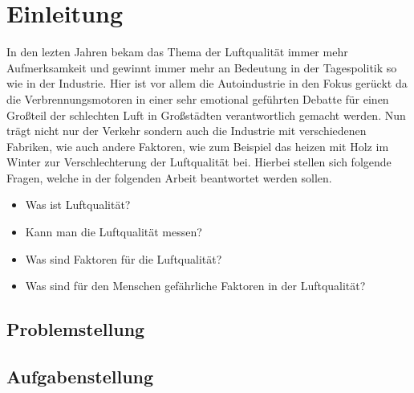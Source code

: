 
\chapter{Einleitung}\label{cha:Einleitung}
In den lezten Jahren bekam das Thema der Luftqualität immer mehr Aufmerksamkeit und gewinnt immer mehr an Bedeutung in der Tagespolitik so wie in der Industrie. Hier ist vor allem die Autoindustrie in den Fokus gerückt da die Verbrennungsmotoren in einer sehr emotional geführten Debatte für einen Großteil der schlechten Luft in Großstädten verantwortlich gemacht werden. Nun trägt nicht nur der Verkehr sondern auch die Industrie mit verschiedenen Fabriken, wie auch andere Faktoren, wie zum Beispiel das heizen mit Holz im Winter zur Verschlechterung der Luftqualität bei.  
\newline
Hierbei stellen sich folgende Fragen, welche in der folgenden Arbeit beantwortet werden sollen.
\begin{itemize}
	\item Was ist Luftqualität?
	\item Kann man die Luftqualität messen?
	\item Was sind Faktoren für die Luftqualität?
	\item Was sind für den Menschen gefährliche Faktoren in der Luftqualität?
\end{itemize}	
 
\section{Problemstellung}\label{sec:Problemstellung}


\section{Aufgabenstellung}\label{sec:Aufgabenstellung}